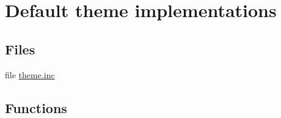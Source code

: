 \hypertarget{group__themeable}{
\section{Default theme implementations}
\label{group__themeable}
}
\subsection*{Files}
\begin{CompactItemize}
\item 
file \hyperlink{includes_2theme_8inc}{theme.inc}
\end{CompactItemize}
\subsection*{Functions}
